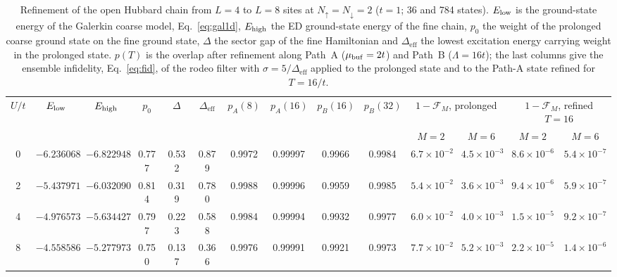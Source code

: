 \documentclass[
  aps,
  prc,
  reprint,
  superscriptaddress,
  floatfix,
  nofootinbib
]{revtex4-2}
\newcommand{\Deff}{\Delta_{\mathrm{eff}}}
\begin{document}
\begin{table}[t]
  \caption{Refinement of the open Hubbard chain from $L=4$ to $L=8$ sites at
  $N_\uparrow=N_\downarrow=2$ ($t=1$; 36 and 784 states).  $E_{\rm low}$ is the
  ground-state energy of the Galerkin coarse model, Eq.~\eqref{eq:gal1d},
  $E_{\rm high}$ the ED ground-state energy of the fine chain, $p_0$ the
  weight of the prolonged coarse ground state on the fine ground state,
  $\Delta$ the sector gap of the fine Hamiltonian and $\Deff$ the lowest
  excitation energy carrying weight in the prolonged state.  $p(T)$ is the
  overlap after refinement along Path~A ($\mu_{\rm buf}=2t$) and Path~B
  ($\Lambda=16t$); the last columns give the ensemble infidelity,
  Eq.~\eqref{eq:fid}, of the rodeo filter with $\sigma=5/\Deff$ applied to
  the prolonged state and to the Path-A state refined for $T=16/t$.}
  \label{tab:chain48}
  \begin{ruledtabular}
  \begin{tabular}{cccccccccccccc}
  $U/t$ & $E_{\rm low}$ & $E_{\rm high}$ & $p_0$ & $\Delta$ & $\Deff$ &
  $p_A(8)$ & $p_A(16)$ & $p_B(16)$ & $p_B(32)$ &
  \multicolumn{2}{c}{$1-\mathcal F_M$, prolonged} & \multicolumn{2}{c}{$1-\mathcal F_M$, refined $T{=}16$}\\
  & & & & & & & & & & $M=2$ & $M=6$ & $M=2$ & $M=6$\\
  \hline
  0 & $-6.236068$ & $-6.822948$ & 0.777 & 0.532 & 0.879 & 0.9972 & 0.99997 & 0.9966 & 0.9984 & $6.7\times10^{-2}$ & $4.5\times10^{-3}$ & $8.6\times10^{-6}$ & $5.4\times10^{-7}$\\
  2 & $-5.437971$ & $-6.032090$ & 0.814 & 0.319 & 0.780 & 0.9988 & 0.99996 & 0.9959 & 0.9985 & $5.4\times10^{-2}$ & $3.6\times10^{-3}$ & $9.4\times10^{-6}$ & $5.9\times10^{-7}$\\
  4 & $-4.976573$ & $-5.634427$ & 0.797 & 0.223 & 0.588 & 0.9984 & 0.99994 & 0.9932 & 0.9977 & $6.0\times10^{-2}$ & $4.0\times10^{-3}$ & $1.5\times10^{-5}$ & $9.2\times10^{-7}$\\
  8 & $-4.558586$ & $-5.277973$ & 0.750 & 0.137 & 0.366 & 0.9976 & 0.99991 & 0.9921 & 0.9973 & $7.7\times10^{-2}$ & $5.2\times10^{-3}$ & $2.2\times10^{-5}$ & $1.4\times10^{-6}$\\
  \end{tabular}
  \end{ruledtabular}
\end{table}
\end{document}

